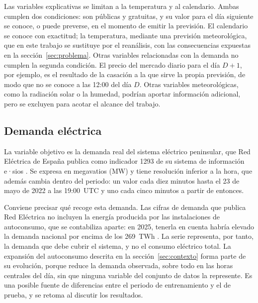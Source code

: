 Las variables explicativas se limitan a la temperatura y al calendario.
Ambas cumplen dos condiciones: son públicas y gratuitas, y su valor para el
día siguiente se conoce, o puede preverse, en el momento de emitir la
previsión. El calendario se conoce con exactitud; la temperatura, mediante
una previsión meteorológica, que en este trabajo se sustituye por el
reanálisis, con las consecuencias expuestas en la
sección~\ref{sec:problema}. Otras variables relacionadas con la demanda no
cumplen la segunda condición. El precio del mercado diario para el día
$D+1$, por ejemplo, es el resultado de la casación a la que sirve la propia
previsión, de modo que no se conoce a las 12:00 del día $D$. Otras variables
meteorológicas, como la radiación solar o la humedad, podrían aportar
información adicional, pero se excluyen para acotar el alcance del trabajo.

\subsection{Demanda eléctrica}\label{sec:datos-demanda}

La variable objetivo es la demanda real del sistema eléctrico peninsular,
que Red Eléctrica de España publica como indicador 1293 de su sistema de
información e·sios \parencite{ree2026demandareal}. Se expresa en megavatios
(MW) y tiene resolución inferior a la hora, que además cambia dentro del
periodo: un valor cada diez minutos hasta el 23 de mayo de 2022 a las
19:00~UTC y uno cada cinco minutos a partir de entonces.

Conviene precisar qué recoge esta demanda. Las cifras de demanda que publica
Red Eléctrica no incluyen la energía producida por las instalaciones de
autoconsumo, que se contabiliza aparte: en 2025, tenerla en cuenta habría
elevado la demanda nacional por encima de los 269~TWh
\parencite{ree2026informe2025}.
La serie representa, por tanto, la demanda que debe cubrir el sistema, y no
el consumo eléctrico total. La expansión del autoconsumo descrita en la
sección~\ref{sec:contexto} forma parte de su evolución, porque reduce la
demanda observada, sobre todo en las horas centrales del día, sin que ninguna
variable del conjunto de datos la represente. Es una posible fuente de
diferencias entre el periodo de entrenamiento y el de prueba, y se retoma al
discutir los resultados.

